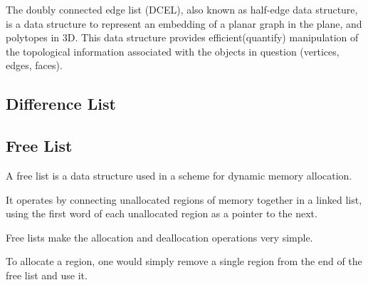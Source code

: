 \documentclass{book}
\begin{document}
The doubly connected edge list (DCEL), also known as half-edge data structure, is a data structure to represent an embedding of a planar graph in the plane, and polytopes in 3D. This data structure provides efficient(quantify) manipulation of the topological information associated with the objects in question (vertices, edges, faces).

\subsection{Difference List}



\subsection{Free List}


A free list is a data structure used in a scheme for dynamic memory allocation.

\noindent It operates by connecting unallocated regions of memory together in a linked list, using the first word of each unallocated region as a pointer to the next.

\noindent Free lists make the allocation and deallocation operations very simple.

\noindent To allocate a region, one would simply remove a single region from the end of the free list and use it.
\end{document}

